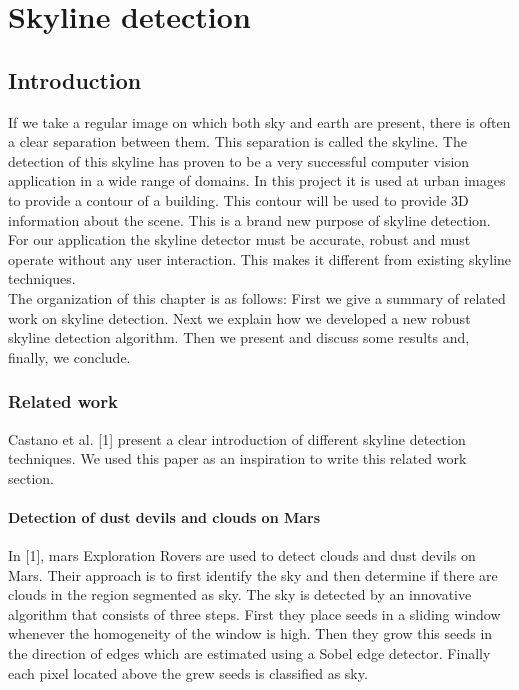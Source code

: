 

\section{Skyline detection}
 \subsection{Introduction}
If we take a regular image on which both sky and earth are present, there
is often a clear separation between them. This separation is called the
skyline. %
The detection of this skyline has proven to be a very successful computer vision
application in a wide range of domains. In this project it is used at urban
images to provide a contour of a building.  This contour will be used to
provide 3D information about the scene. This is a brand new purpose of skyline
detection.\\
For our application the skyline detector must be accurate, robust and must
operate without any user interaction. This makes it different from existing
skyline techniques.\\
The organization of this chapter is as follows:  First we give a summary of
related work on skyline detection.  Next we explain how we developed a new
robust skyline detection algorithm.  Then we present and discuss some results
and, finally, we conclude.

\subsubsection{Related work}
Castano et al. [1] present a clear introduction of different skyline
detection techniques. We used this paper as an inspiration to write this related work
section.


\paragraph{Detection of dust devils and clouds on Mars}
In [1], mars Exploration Rovers are used to detect clouds and dust devils on Mars.
Their approach is to first identify the sky and then determine if there are
clouds in the region segmented as sky. The sky is detected by an innovative
algorithm that consists of three steps.  First they place seeds in a sliding
window whenever the homogeneity of the window is high. Then they grow this seeds
in the direction of edges which are estimated using a Sobel edge detector.
Finally each pixel located above the grew seeds is classified as sky.\\

